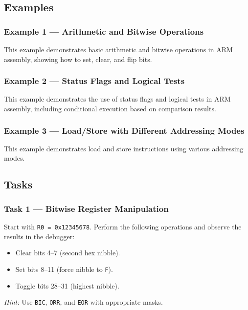 \subsection{Examples}

\subsubsection{Example 1 --- Arithmetic and Bitwise Operations}
This example demonstrates basic arithmetic and bitwise operations in ARM assembly, showing how to set, clear, and flip bits.


\newpage
\subsubsection{Example 2 --- Status Flags and Logical Tests}
This example demonstrates the use of status flags and logical tests in ARM assembly, including conditional execution based on comparison results.


\newpage
\subsubsection{Example 3 --- Load/Store with Different Addressing Modes}
This example demonstrates load and store instructions using various addressing modes.

\subsection{Tasks}

\subsubsection{Task 1 --- Bitwise Register Manipulation}
Start with \texttt{R0 = 0x12345678}. Perform the following operations and observe the results in the debugger:
\begin{itemize}[nosep]
    \item Clear bits 4--7 (second hex nibble).
    \item Set bits 8--11 (force nibble to \texttt{F}).
    \item Toggle bits 28--31 (highest nibble).
\end{itemize}
\emph{Hint:} Use \texttt{BIC}, \texttt{ORR}, and \texttt{EOR} with appropriate masks.

